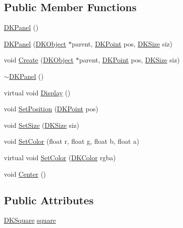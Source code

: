 \subsection*{Public Member Functions}
\begin{DoxyCompactItemize}
\item 
\hyperlink{class_d_k_panel_a28cac979cf0a4097280bc6cc0c653155}{D\-K\-Panel} ()
\item 
\hyperlink{class_d_k_panel_a52a75d4a12805ee6f4b4d1471dc2d707}{D\-K\-Panel} (\hyperlink{class_d_k_object}{D\-K\-Object} $\ast$parent, \hyperlink{_d_k_axis_8h_a0ca1f005fbb936f8e7a7f2433591f418}{D\-K\-Point} pos, \hyperlink{_d_k_axis_8h_aaa25a8c7cbf504fffdb8a4208ff7a731}{D\-K\-Size} siz)
\item 
void \hyperlink{class_d_k_panel_ab545509bf56d9f39b1c7c1f275aa885f}{Create} (\hyperlink{class_d_k_object}{D\-K\-Object} $\ast$parent, \hyperlink{_d_k_axis_8h_a0ca1f005fbb936f8e7a7f2433591f418}{D\-K\-Point} pos, \hyperlink{_d_k_axis_8h_aaa25a8c7cbf504fffdb8a4208ff7a731}{D\-K\-Size} siz)
\item 
\hyperlink{class_d_k_panel_aa2234fd6a2412fb9618f9b828dc61663}{$\sim$\-D\-K\-Panel} ()
\item 
virtual void \hyperlink{class_d_k_panel_ae254b9bdde5b46f508c539d7a9090c3d}{Display} ()
\item 
void \hyperlink{class_d_k_panel_ad6e6c8c2e6691f513078fb0b112e6b0b}{Set\-Position} (\hyperlink{_d_k_axis_8h_a0ca1f005fbb936f8e7a7f2433591f418}{D\-K\-Point} pos)
\item 
void \hyperlink{class_d_k_panel_a505d2b7239e9d042242582354fe79a0b}{Set\-Size} (\hyperlink{_d_k_axis_8h_aaa25a8c7cbf504fffdb8a4208ff7a731}{D\-K\-Size} siz)
\item 
void \hyperlink{class_d_k_panel_ae73ce1ee5592d4c3083d6c6f193886b9}{Set\-Color} (float r, float g, float b, float a)
\item 
virtual void \hyperlink{class_d_k_panel_a9e564424f3fbc9d57a00c4d3eea2dded}{Set\-Color} (\hyperlink{class_d_k_color}{D\-K\-Color} rgba)
\item 
void \hyperlink{class_d_k_panel_a42715bbb3f78f8eb43014b1ead21ac49}{Center} ()
\end{DoxyCompactItemize}
\subsection*{Public Attributes}
\begin{DoxyCompactItemize}
\item 
\hyperlink{class_d_k_square}{D\-K\-Square} \hyperlink{class_d_k_panel_a3e6eea044da02cccf8720a616fb36915}{square}
\end{DoxyCompactItemize}
